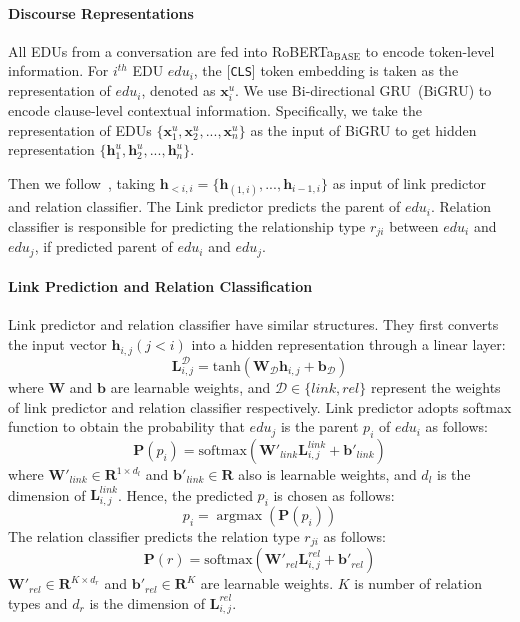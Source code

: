 \documentclass[11pt]{article}
\begin{document}
\paragraph{Discourse Representations}
All EDUs from a conversation are fed into RoBERTa$_{\textrm{BASE}}$ to encode token-level information.
For $i^{th}$ EDU $edu_i$, the [\texttt{CLS}] token embedding is taken as the representation of $edu_i$, denoted as $\mathbf{x}_i^u$.
We use Bi-directional GRU~(BiGRU) to encode clause-level contextual information.
Specifically, we take the representation of EDUs $\{\mathbf{x}_1^u, \mathbf{x}_2^u, ..., \mathbf{x}_n^u\}$ as the input of BiGRU to get hidden representation $\{\mathbf{h}_1^u, \mathbf{h}_2^u, ..., \mathbf{h}_n^u\}$.

Then we follow~\citet{shi_deep_2019}, taking $\mathbf{h}_{<i,i} = \{\mathbf{h}_{(1,i)}, ..., \mathbf{h}_{i-1,i}\}$ as input of link predictor and relation classifier.
The Link predictor predicts the parent of $edu_i$.
Relation classifier is responsible for predicting the relationship type $r_{ji}$ between $edu_i$ and $edu_j$, if predicted parent of $edu_i$ and $edu_j$.

\paragraph{Link Prediction and Relation Classification}
Link predictor and relation classifier have similar structures.
They first converts the input vector $\mathbf{h}_{i,j}(j<i)$ into a hidden representation through a linear layer:
\begin{equation}
    \mathbf{L}_{i,j}^\mathcal{D}  = \mathrm{tanh}(\mathbf{W}_\mathcal{D}\mathbf{h}_{i,j} + \mathbf{b}_\mathcal{D})
\end{equation}
where $\mathbf{W}$ and $\mathbf{b}$ are learnable weights,
and $\mathcal{D} \in \{link, rel\}$ represent the weights of link predictor and relation classifier respectively.
Link predictor adopts softmax function to obtain the probability that $edu_j$ is the parent $p_i$ of $edu_i$ as follows:
\begin{equation}
\mathbf{P}(p_i) = \mathrm{softmax}(\mathbf{W'}_{link}\mathbf{L}_{i,j}^{link} + \mathbf{b'}_{link})
\end{equation}
where $\mathbf{W'}_{link} \in \mathbf{R}^{1 \times d_l}$ and $\mathbf{b'}_{link} \in \mathbf{R}$ also is learnable weights, and $d_l$ is the dimension of $\mathbf{L}_{i,j}^{link}$.
Hence, the predicted $p_i$ is chosen as follows:
\begin{equation}
    p_i = \mathop{\arg\max}(\mathbf{P}(p_i))
\end{equation}
The relation classifier predicts the relation type $r_{ji}$ as follows:
\begin{equation}
    \mathbf{P}(r) = \mathrm{softmax}(\mathbf{W'}_{rel}\mathbf{L}_{i,j}^{rel} + \mathbf{b'}_{rel})
\end{equation}
$\mathbf{W'}_{rel} \in \mathbf{R}^{K \times d_r}$ and $\mathbf{b'}_{rel} \in \mathbf{R}^K$ are learnable weights. 
$K$ is number of relation types and $d_r$ is the dimension of $\mathbf{L}_{i,j}^{rel}$.
\end{document}
